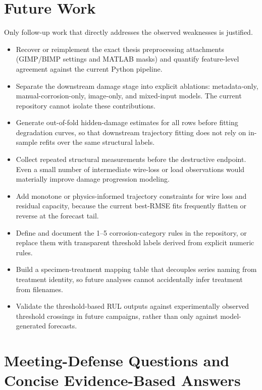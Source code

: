 \documentclass[11pt,a4paper]{article}
\begin{document}
\section{Future Work}

Only follow-up work that directly addresses the observed weaknesses is justified.

\begin{itemize}
  \item Recover or reimplement the exact thesis preprocessing attachments (GIMP/BIMP settings and MATLAB masks) and quantify feature-level agreement against the current Python pipeline.
  \item Separate the downstream damage stage into explicit ablations: metadata-only, manual-corrosion-only, image-only, and mixed-input models. The current repository cannot isolate these contributions.
  \item Generate out-of-fold hidden-damage estimates for all rows before fitting degradation curves, so that downstream trajectory fitting does not rely on in-sample refits over the same structural labels.
  \item Collect repeated structural measurements before the destructive endpoint. Even a small number of intermediate wire-loss or load observations would materially improve damage progression modeling.
  \item Add monotone or physics-informed trajectory constraints for wire loss and residual capacity, because the current best-RMSE fits frequently flatten or reverse at the forecast tail.
  \item Define and document the 1--5 corrosion-category rules in the repository, or replace them with transparent threshold labels derived from explicit numeric rules.
  \item Build a specimen-treatment mapping table that decouples series naming from treatment identity, so future analyses cannot accidentally infer treatment from filenames.
  \item Validate the threshold-based RUL outputs against experimentally observed threshold crossings in future campaigns, rather than only against model-generated forecasts.
\end{itemize}

\appendix

\section{Meeting-Defense Questions and Concise Evidence-Based Answers}
\end{document}
